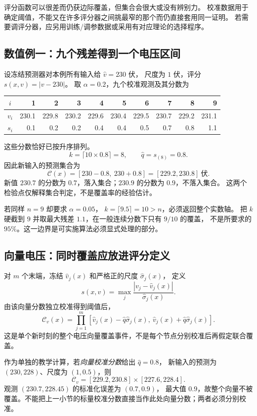 \documentclass[UTF8,11pt,fontset=fandol,openany,oneside]{ctexbook}
\theoremstyle{definition}
\theoremstyle{remark}
\numberwithin{equation}{chapter}
\begin{document}
评分函数可以很差而仍获边际覆盖，但集合会很大或没有辨别力。
校准数据用于确定阈值，不能又在许多评分器之间挑最窄的那个而仍直接套用同一证明。
若需要调评分器，应另用训练/调参数据或采用有对应理论的选择程序。

\subsection{数值例一：九个残差得到一个电压区间}

设冻结预测器对本例所有输入给 $\widehat v=230$ 伏，
尺度为 $1$ 伏，评分 $s(x,v)=|v-230|$。
取 $\alpha=0.2$，九个校准观测及其分数为
\begin{center}
\begin{tabular}{crrrrrrrrr}
\toprule
$i$ &1&2&3&4&5&6&7&8&9\\
\midrule
$v_i$ &230.1&229.8&230.2&229.6&230.4&229.5&230.7&229.2&231.1\\
$s_i$ &0.1&0.2&0.2&0.4&0.4&0.5&0.7&0.8&1.1\\
\bottomrule
\end{tabular}
\end{center}
这些分数恰好已按升序排列。
\[
 k=\lceil10\times0.8\rceil=8,\qquad
 \widehat q=s_{(8)}=0.8.
\]
因此新输入的预测集合为
\[
 \mathcal C(x)=[230-0.8,\ 230+0.8]=[229.2,230.8]\ \text{伏}.
\]
新值 $230.7$ 的分数为 $0.7$，落入集合；$230.9$ 的分数为 $0.9$，不落入集合。
这两个检验点仅解释集合判定，不是覆盖率的经验估计。

若同样 $n=9$ 却要求 $\alpha=0.05$，
$k=\lceil9.5\rceil=10>n$，必须返回整个实数轴。
把 $k$ 硬截到 $9$ 并取最大残差 $1.1$，在一般连续分数下只有 $9/10$ 的覆盖，
不是所要求的 $95\%$。这一边界是可实施算法必须显式处理的部分。

\subsection{向量电压：同时覆盖应放进评分定义}

对 $m$ 个末端，冻结 $\widehat v_j(x)$ 和严格正的尺度 $\widehat\sigma_j(x)$，
定义
\[
 s(x,v)=\max_j\frac{|v_j-\widehat v_j(x)|}{\widehat\sigma_j(x)}.
\]
由该向量分数独立校准得到阈值后，
\[
 \mathcal C_v(x)=
 \prod_{j=1}^m
 [\widehat v_j(x)-\widehat q\widehat\sigma_j(x),\
  \widehat v_j(x)+\widehat q\widehat\sigma_j(x)].
\]
这是单个新时刻的整个电压向量覆盖事件，不是每个节点分别校准后再假定联合覆盖。

作为单独的教学计算，若\emph{向量校准分数}给出 $\widehat q=0.8$，
新输入的预测为 $(230,228)$、尺度为 $(1,0.5)$，则
\[
 \mathcal C_v=[229.2,230.8]\times[227.6,228.4].
\]
观测 $(230.7,228.45)$ 的标准化误差为 $(0.7,0.9)$，
最大值 $0.9$，故整个向量不被覆盖。不能把上一小节的标量校准分数直接当作此处向量分数；两者必须分别校准。
\end{document}
